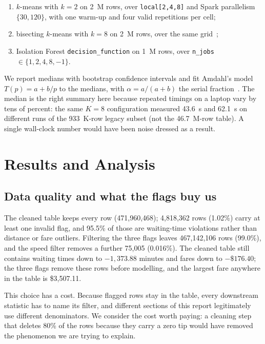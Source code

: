 \documentclass[11pt,a4paper]{article}
\newcommand{\code}[1]{\texttt{\small #1}}
\begin{document}
\begin{enumerate}
\item[(K1)] $k$-means with $k=2$ on 2~M rows, over \code{local[2,4,8]} and Spark parallelism $\{30,120\}$, with one warm-up and four valid repetitions per cell;
\item[(K2)] bisecting $k$-means with $k=8$ on 2~M rows, over the same grid~\cite{steinbach2000};
\item[(S3)] Isolation Forest \code{decision\_function} on 1~M rows, over \code{n\_jobs} $\in \{1,2,4,8,-1\}$.
\end{enumerate}

We report medians with bootstrap confidence intervals and fit Amdahl's model $T(p) = a + b/p$ to the medians, with $\alpha = a/(a+b)$ the serial fraction~\cite{amdahl1967}. The median is the right summary here because repeated timings on a laptop vary by tens of percent: the same $K=8$ configuration measured 43.6~s and 62.1~s on different runs of the 933~K-row legacy subset (not the 46.7~M-row table). A single wall-clock number would have been noise dressed as a result.

\section{Results and Analysis}
\label{sec:results}

\subsection{Data quality and what the flags buy us}

The cleaned table keeps every row (471{,}960{,}468); 4{,}818{,}362 rows (1.02\%) carry at least one invalid flag, and 95.5\% of those are waiting-time violations rather than distance or fare outliers. Filtering the three flags leaves 467{,}142{,}106 rows (99.0\%), and the speed filter removes a further 75{,}005 (0.016\%). The cleaned table still contains waiting times down to $-1{,}373.88$ minutes and fares down to $-\$176.40$; the three flags remove these rows before modelling, and the largest fare anywhere in the table is \$3{,}507.11.

This choice has a cost. Because flagged rows stay in the table, every downstream statistic has to name its filter, and different sections of this report legitimately use different denominators. We consider the cost worth paying: a cleaning step that deletes 80\% of the rows because they carry a zero tip would have removed the phenomenon we are trying to explain.
\end{document}
